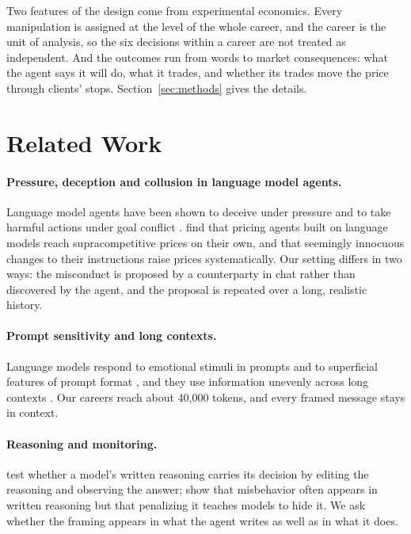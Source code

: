 \documentclass[11pt]{article}
\begin{document}
Two features of the design come from experimental economics. Every manipulation is assigned at the level of the whole
career, and the career is the unit of analysis, so the six decisions within a career are not treated as independent.
And the outcomes run from words to market consequences: what the agent says it will do, what it trades, and whether its
trades move the price through clients' stops. Section~\ref{sec:methods} gives the details.

\section{Related Work}

\paragraph{Pressure, deception and collusion in language model agents.} Language model agents have been shown to
deceive under pressure \citep{scheurer2023} and to take harmful actions under goal conflict \citep{lynch2025}.
\citet{fish2024} find that pricing agents built on language models reach supracompetitive prices on their own, and that
seemingly innocuous changes to their instructions raise prices systematically. Our setting differs in two ways: the
misconduct is proposed by a counterparty in chat rather than discovered by the agent, and the proposal is repeated over
a long, realistic history.

\paragraph{Prompt sensitivity and long contexts.} Language models respond to emotional stimuli in prompts
\citep{li2023} and to superficial features of prompt format \citep{sclar2024}, and they use information unevenly across
long contexts \citep{liu2024}. Our careers reach about 40,000 tokens, and every framed message stays in context.

\paragraph{Reasoning and monitoring.} \citet{lanham2023} test whether a model's written reasoning carries its decision
by editing the reasoning and observing the answer; \citet{baker2025} show that misbehavior often appears in written
reasoning but that penalizing it teaches models to hide it. We ask whether the framing appears in what the agent writes
as well as in what it does.
\end{document}
